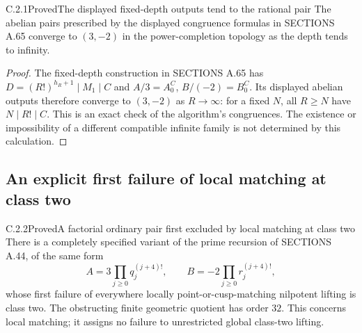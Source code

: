 \begin{result}{C.2.1}{Proved}{The displayed fixed-depth outputs tend to the rational pair}
\label{prop:ghost-a65-limit}
The abelian pairs prescribed by the displayed congruence formulas
in SECTIONS A.65 converge to \((3,-2)\) in the power-completion
topology as the depth tends to infinity.
\end{result}
\begin{proof}
The fixed-depth construction in SECTIONS A.65 has
\(D=(R!)^{h_R+1}\mid M_1\mid C\) and
\(A/3=A_0^C\), \(B/(-2)=B_0^C\). Its displayed abelian outputs
therefore converge to \((3,-2)\) as \(R\to\infty\): for a
fixed \(N\), all \(R\ge N\) have \(N\mid R!\mid C\).
This is an exact check of the algorithm's congruences. The
existence or impossibility of a different compatible infinite
family is not determined by this calculation.
\end{proof}

\subsection{An explicit first failure of local matching at class two}
\begin{result}{C.2.2}{Proved}{A factorial ordinary pair first excluded by local matching at class two}
\label{thm:ghost-factorial-selmer32}
There is a completely specified variant of the prime recursion of
SECTIONS A.44, of the same form
\[
 A=3\prod_{j\ge0}q_j^{(j+4)!},\qquad
 B=-2\prod_{j\ge0}r_j^{(j+4)!},
\]
whose first failure of everywhere locally point-or-cusp-matching
nilpotent lifting is class two. The obstructing finite geometric
quotient has order \(32\). This concerns local matching; it
assigns no failure to unrestricted global class-two lifting.
\end{result}

